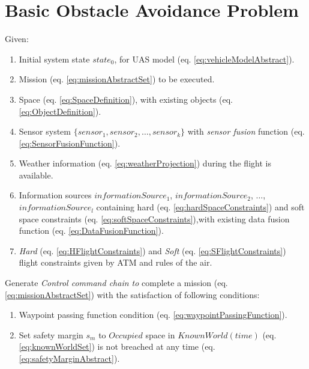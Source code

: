 \section{Basic Obstacle Avoidance Problem}\label{s:BasicProblemDefinition}
    \noindent Given:

    \begin{enumerate}
        \item Initial system state $state_0$, for UAS model (eq. \ref{eq:vehicleModelAbstract}).
        
        \item Mission (eq. \ref{eq:missionAbstractSet}) to be executed.
        
        \item Space (eq. \ref{eq:SpaceDefinition}), with existing objects (eq. \ref{eq:ObjectDefinition}).
        
        \item Sensor system $\{sensor_1, sensor_2,\dots,sensor_k\}$ with \emph{sensor fusion} function (eq. \ref{eq:SensorFusionFunction}).
        
        \item Weather information (eq. \ref{eq:weatherProjection}) during the flight is available.
        
        \item Information sources $informationSource_1$, $informationSource_2$, $\dots$, $informationSource_l$ containing hard (eq. \ref{eq:hardSpaceConstraints}) and soft space constraints (eq. \ref{eq:softSpaceConstraints}),with existing data fusion function (eq. \ref{eq:DataFusionFunction}).
        
        \item \emph{Hard} (eq. \ref{eq:HFlightConstraints}) and \emph{Soft} (eq. \ref{eq:SFlightConstraints}) flight constraints given by ATM and rules of the air. 
    \end{enumerate}

    \noindent Generate \emph{Control command chain to} complete a mission (eq. \ref{eq:missionAbstractSet}) with the satisfaction of following conditions:
    
    \begin{enumerate}
        \item Waypoint passing function condition (eq. \ref{eq:waypointPassingFunction}).
        
        \item Set safety margin $s_m$ to $Occupied$  space in $KnownWorld(time)$ (eq. \ref{eq:knownWorldSet}) is not breached at any time (eq. \ref{eq:safetyMarginAbstract}).
    \end{enumerate}
